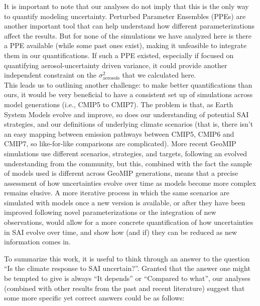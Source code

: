 \documentclass[acp, manuscript]{copernicus}
\begin{document}
It is important to note that our analyses do not imply that this is the only way to quantify modeling uncertainty. Perturbed Parameter Ensembles (PPEs) are another important tool that can help understand how different parameterizations affect the results. But for none of the simulations we have analyzed here is there a PPE available (while some past ones exist), making it unfeasible to integrate them in our quantifications. If such a PPE existed, especially if focused on quantifying aerosol-uncertainty driven variance, it could provide another independent constraint on the $\sigma^2_{\mathrm{aerosols}}$ that we calculated here.\\

This leads us to outlining another challenge: to make better quantifications than ours, it would be very beneficial to have a consistent set up of simulations across model generations (i.e., CMIP5 to CMIP7). The problem is that, as Earth System Models evolve and improve, so does our understanding of potential SAI strategies, and our definitions of underlying climate scenarios (that is, there isn't an easy mapping between emission pathways between CMIP5, CMIP6 and CMIP7, so like-for-like comparisons are complicated). More recent GeoMIP simulations use different scenarios, strategies, and targets, following an evolved understanding from the community, but this, combined with the fact the sample of models used is different across GeoMIP generations, means that a precise assessment of how uncertainties evolve over time as models become more complex remains elusive. A more iterative process \citep[as proposed for instance by][]{visioni_living2024} in which the same scenarios are simulated with models once a new version is available, or after they have been improved following novel parameterizations or the integration of new observations, would allow for a more concrete quantification of how uncertainties in SAI evolve over time, and show how (and if) they can be reduced as new information comes in. 

To summarize this work, it is useful to think through an answer to the question ``Is the climate response to SAI uncertain?''. Granted that the answer one might be tempted to give is always ``It depends'' or ``Compared to what'', our analyses (combined with other results from the past and recent literature) suggest that some more specific yet correct answers could be as follows:
\end{document}
